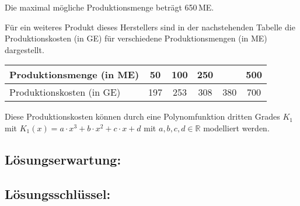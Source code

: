 \begin{langesbeispiel}
\begin{aufgabenstellung}

Die maximal mögliche Produktionsmenge beträgt 650\,ME.


\item Für ein weiteres Produkt dieses Herstellers sind in der nachstehenden Tabelle die Produktionskosten (in GE) für verschiedene Produktionsmengen (in ME) dargestellt.
	
	\begin{tabular}{|l|c|c|c|c|c|}\hline
	\cellcolor[gray]{0.9}Produktionsmenge (in ME)&50&100&250&\antwort{$\approx 365$}&500\\ \hline
	\cellcolor[gray]{0.9}Produktionskosten (in GE)&197&253&308&380&700\\ \hline
	\end{tabular}
	
	Diese Produktionskosten können durch eine Polynomfunktion dritten Grades $K_1$ mit $K_1(x)=a\cdot x^3+b\cdot x^2+c\cdot x+d$ mit $a,b,c,d\in\mathbb{R}$ modelliert werden.%


\end{aufgabenstellung}

\begin{loesung}
\item \subsection{Lösungserwartung:} 


\setcounter{subitemcounter}{0}
\subsection{Lösungsschlüssel:}
 

\end{loesung}
\end{langesbeispiel}
